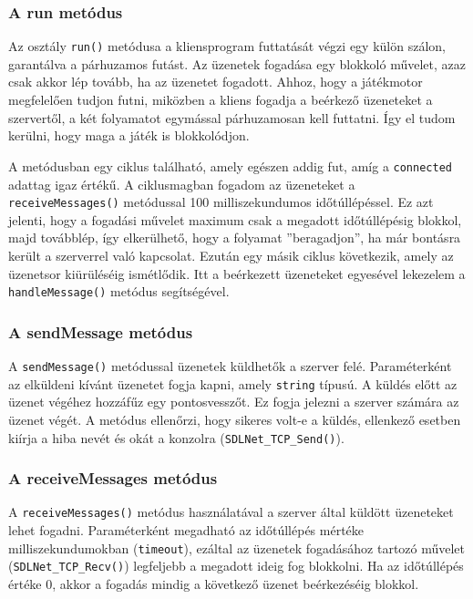 \subsubsection{A run metódus}

Az osztály \verb|run()| metódusa a kliensprogram futtatását végzi egy külön szálon, garantálva a párhuzamos futást. Az üzenetek fogadása egy blokkoló művelet, azaz csak akkor lép tovább, ha az üzenetet fogadott. Ahhoz, hogy a játékmotor megfelelően tudjon futni, miközben a kliens fogadja a beérkező üzeneteket a szervertől, a két folyamatot egymással párhuzamosan kell futtatni. Így el tudom kerülni, hogy maga a játék is blokkolódjon.

A metódusban egy ciklus található, amely egészen addig fut, amíg a \verb|connected| adattag igaz értékű. A ciklusmagban fogadom az üzeneteket a \verb|receiveMessages()| metódussal 100 milliszekundumos időtúllépéssel. Ez azt jelenti, hogy a fogadási művelet maximum csak a megadott időtúllépésig blokkol, majd továbblép, így elkerülhető, hogy a folyamat ''beragadjon'', ha már bontásra került a szerverrel való kapcsolat. Ezután egy másik ciklus következik, amely az üzenetsor kiürüléséig ismétlődik. Itt a beérkezett üzeneteket egyesével lekezelem a \verb|handleMessage()| metódus segítségével.

\subsubsection{A sendMessage metódus}

A \verb|sendMessage()| metódussal üzenetek küldhetők a szerver felé. Paraméterként az elküldeni kívánt üzenetet fogja kapni, amely \verb|string| típusú. A küldés előtt az üzenet végéhez hozzáfűz egy pontosvesszőt. Ez fogja jelezni a szerver számára az üzenet végét. A metódus ellenőrzi, hogy sikeres volt-e a küldés, ellenkező esetben kiírja a hiba nevét és okát a konzolra (\verb|SDLNet_TCP_Send()|).

\subsubsection{A receiveMessages metódus}

A \verb|receiveMessages()| metódus használatával a szerver által küldött üzeneteket lehet fogadni. Paraméterként megadható az időtúllépés mértéke milliszekundumokban (\verb|timeout|), ezáltal az üzenetek fogadásához tartozó művelet (\verb|SDLNet_TCP_Recv()|) legfeljebb a megadott ideig fog blokkolni. Ha az időtúllépés értéke 0, akkor a fogadás mindig a következő üzenet beérkezéséig blokkol.

